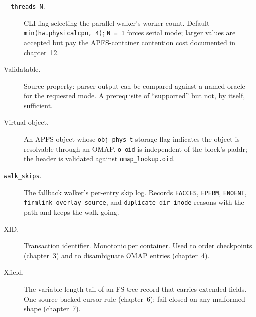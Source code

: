 \begin{description}
  \item[\texttt{-{}-threads N}.] CLI flag selecting the parallel
    walker's worker count. Default
    \texttt{min(hw.physicalcpu, 4)}; \texttt{N = 1} forces serial
    mode; larger values are accepted but pay the APFS-container
    contention cost documented in chapter~12.
  \item[Validatable.] Source property: parser output can be
    compared against a named oracle for the requested mode. A
    prerequisite of ``supported'' but not, by itself, sufficient.
  \item[Virtual object.] An APFS object whose
    \texttt{obj\_phys\_t} storage flag indicates the object is
    resolvable through an OMAP. \texttt{o\_oid} is independent of
    the block's paddr; the header is validated against
    \texttt{omap\_lookup.oid}.
  \item[\texttt{walk\_skips}.] The fallback walker's per-entry
    skip log. Records \texttt{EACCES}, \texttt{EPERM},
    \texttt{ENOENT}, \texttt{firmlink\_overlay\_source}, and
    \texttt{duplicate\_dir\_inode} reasons with the path and
    keeps the walk going.
  \item[XID.] Transaction identifier. Monotonic per container.
    Used to order checkpoints (chapter~3) and to disambiguate
    OMAP entries (chapter~4).
  \item[Xfield.] The variable-length tail of an FS-tree record
    that carries extended fields. One source-backed cursor rule
    (chapter~6); fail-closed on any malformed shape
    (chapter~7).
\end{description}
